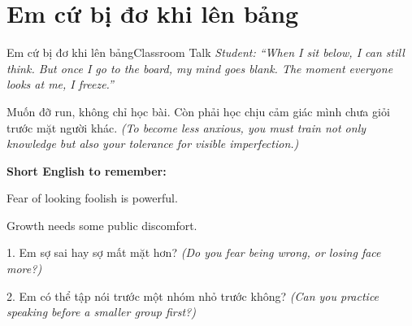 \section{Em cứ bị đơ khi lên bảng}
\begin{truyen}{Em cứ bị đơ khi lên bảng}{Classroom Talk}
\textit{Student: ``When I sit below, I can still think. But once I go to the board, my mind goes blank. The moment everyone looks at me, I freeze.''}\\[4pt]



\end{truyen}

\begin{baihoc}
Muốn đỡ run, không chỉ học bài. Còn phải học chịu cảm giác mình chưa giỏi trước mặt người khác.
\textit{(To become less anxious, you must train not only knowledge but also your tolerance for visible imperfection.)}
\end{baihoc}

\begin{ghinhoanh}
\textbf{Short English to remember:}

Fear of looking foolish is powerful.

Growth needs some public discomfort.
\end{ghinhoanh}

\begin{tuhocnhanh}
1. Em sợ sai hay sợ mất mặt hơn? \textit{(Do you fear being wrong, or losing face more?)}

2. Em có thể tập nói trước một nhóm nhỏ trước không? \textit{(Can you practice speaking before a smaller group first?)}
\end{tuhocnhanh}
\ngancach

